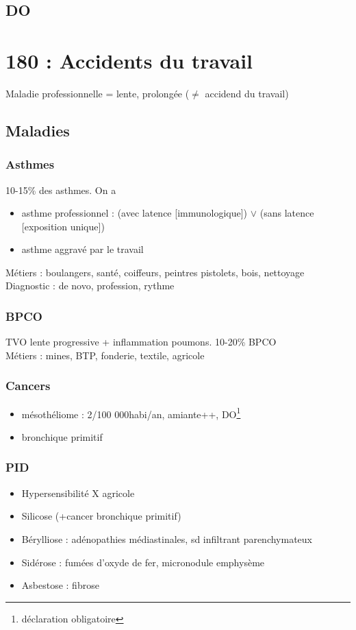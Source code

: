 \subsection{DO}



\section{180 : Accidents du travail}
Maladie professionnelle = lente, prolongée (\(\neq\) accidend du travail)
\subsection{Maladies}
\subsubsection{Asthmes}
10-15\% des asthmes. On a
\begin{itemize}
  \item asthme professionnel : (avec latence [immunologique]) \(\vee\) (sans latence
    [exposition unique])
  \item asthme aggravé par le travail
\end{itemize}
Métiers : boulangers, santé, coiffeurs, peintres pistolets, bois, nettoyage\\
Diagnostic : de novo, profession, rythme
\subsubsection{BPCO}
TVO lente progressive + inflammation poumons. 10-20\% BPCO\\
Métiers : mines, BTP, fonderie, textile, agricole
\subsubsection{Cancers}
\begin{itemize}
  \item mésothéliome : 2/100 000habi/an, amiante++, DO\footnote{déclaration obligatoire}
  \item bronchique primitif
\end{itemize}
\subsubsection{PID}
\begin{itemize}
  \item Hypersensibilité X agricole
  \item Silicose (+cancer bronchique primitif)
  \item Bérylliose : adénopathies médiastinales, sd infiltrant parenchymateux
  \item Sidérose : fumées d'oxyde de fer, micronodule \textpm{} emphysème
  \item Asbestose : fibrose
\end{itemize}
